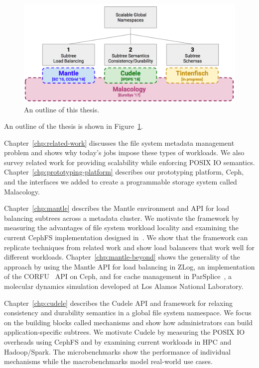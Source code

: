 \begin{figure}[tb]
  \centering
  \includegraphics[width=1\textwidth]{./chapters/overview.png}
  \caption{An outline of this thesis.}
  \label{fig:thesis-overview}
\end{figure}

An outline of the thesis is shown in Figure~\ref{fig:thesis-overview}.

Chapter~\ref{chp:related-work} discusses the file system metadata management
problem and shows why today's jobs impose these types of workloads. We also
survey related work for providing scalability while enforcing POSIX IO
semantics. Chapter~\ref{chp:prototyping-platform} describes our prototyping
platform, Ceph, and the interfaces we added to create a programmable storage
system called Malacology.

Chapter~\ref{chp:mantle} describes the Mantle environment and API for load
balancing subtrees across a metadata cluster. We motivate the framework by
measuring the advantages of file system workload locality and examining the
current CephFS implementation designed in~\cite{weil:osdi2006-ceph,
weil:sc2004-dyn-metadata}. We show that the framework can replicate techniques
from related work and show load balancers that work well for different
workloads. Chapter~\ref{chp:mantle-beyond} shows the generality of the approach
by using the Mantle API for load balancing in ZLog, an implementation of the
CORFU~\cite{balakrishnan_corfu_2012} API on Ceph, and for cache management in
ParSplice~\cite{perez:jctc20150parsplice}, a molecular dynamics simulation
developed at Los Alamos National Laboratory.

Chapter~\ref{chp:cudele} describes the Cudele API and framework for relaxing
consistency and durability semantics in a global file system namespace. We
focus on the building blocks called mechanisms and show how administrators can
build application-specific subtrees.  We motivate Cudele by measuring the POSIX
IO overheads using CephFS and by examining current workloads in HPC and
Hadoop/Spark. The microbenchmarks show the performance of individual mechanisms
while the macrobenchmarks model real-world use cases.

